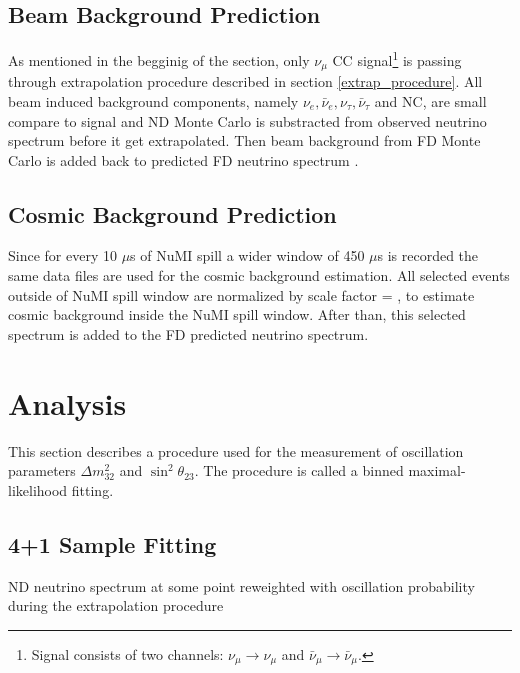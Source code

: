 \subsection{Beam Background Prediction}
As mentioned in the begginig of the section, only $\nu_\mu$ CC signal\footnote{Signal consists of two
channels: $\nu_\mu \rightarrow \nu_\mu$ and $\bar\nu_\mu \rightarrow \bar\nu_\mu$.} is passing 
through extrapolation procedure described in section \ref{extrap_procedure}. All beam induced 
background components, namely $\nu_e, \bar\nu_e, \nu_\tau, \bar\nu_\tau$ and NC, are small compare 
to signal and ND Monte Carlo is substracted from observed neutrino spectrum before it get extrapolated.
Then beam background from FD Monte Carlo is added back to predicted FD neutrino spectrum \cite{extrap_technote}. 

\subsection{Cosmic Background Prediction}
Since for every 10 $\mu$s of NuMI spill a wider window of 450 $\mu$s is recorded the same data files
are used for the cosmic background estimation. All selected events outside of NuMI spill window are 
normalized by scale factor 
\be
{} = ,
\ee
to estimate cosmic background inside the NuMI spill window. After than, this selected spectrum is added 
to the FD predicted neutrino spectrum.

\section{Analysis}
This section describes a procedure used for the measurement of oscillation parameters $\Delta m^2_{32}$ 
and $\sin^2\theta_{23}$. The procedure is called a binned maximal-likelihood fitting.

\subsection{4+1 Sample Fitting}
ND neutrino spectrum at some point reweighted with oscillation probability during the extrapolation procedure 
